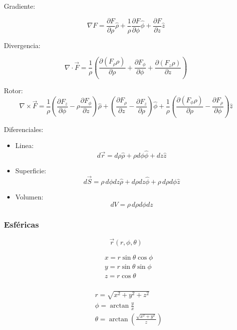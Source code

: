 Gradiente:

\[\nabla F = \frac{\partial F}{\partial \rho}\hat{\rho} + \frac{1}{\rho}\frac{\partial F}{\partial \phi}\hat{\phi} + \frac{\partial F}{\partial z}\hat{z}\]

Divergencia:

\[\nabla \cdot \vec{F} = \frac{1}{\rho}\left(\frac{\partial(F_{\rho}\rho)}{\partial\rho}+\frac{\partial F_{\phi}}{\partial\phi}+\frac{\partial(F_{z}\rho)}{\partial z}\right)\]

Rotor:
\[\nabla\times\vec{F} = \frac{1}{\rho}\left(\frac{\partial F_{z}}{\partial \phi}-\rho\frac{\partial F_{\phi}}{\partial z}\right)\hat{\rho} + \left(\frac{\partial F_{\rho}}{\partial z}-\frac{\partial F_{z}}{\partial \rho}\right)\hat{\phi} + \frac{1}{\rho}\left(\frac{\partial(F_{\phi}\rho)}{\partial \rho}-\frac{\partial F_{\rho}}{\partial \phi}\right)\hat{z}\]

\medbreak

Diferenciales:

\begin{itemize}
    \item Linea:
    \[d\vec{r} = d\rho\hat{\rho} + \rho d\phi\hat{\phi}+dz\hat{z}\]
    \item Superficie:
    \[d\vec{S} = \rho\,d\phi dz\hat{\rho}+d\rho dz\hat{\phi}+\rho\, d\rho d\phi\hat{z}\]
    \item Volumen:
    \[dV = \rho\,d\rho d\phi dz\]
\end{itemize}

\newpage
\subsubsection{Esféricas}

\[\Vec{r}(r,\phi,\theta)\]

\begin{minipage}{0.55\textwidth}
\begin{equation}
\begin{split}
    &x = r\sin{\theta}\cos{\phi}\\
    &y = r\sin{\theta}\sin{\phi}\\
    &z = r\cos{\theta}\\
\end{split}
\nonumber
\end{equation}
\end{minipage}
\begin{minipage}{0.35\textwidth}
\begin{equation}
\begin{split}
    & r = \sqrt{x^2+y^2+z^2}\\
    & \phi = \arctan{\frac{y}{x}}\\
    & \theta = \arctan{\left(\frac{\sqrt{x^2+ y^2}}{z}\right)}
\end{split}
\nonumber
\end{equation}
\end{minipage}

